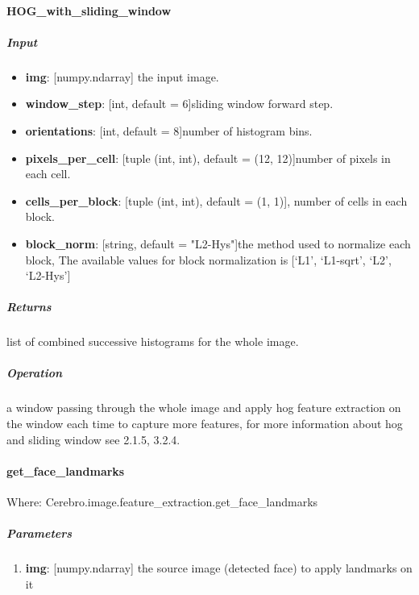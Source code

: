 \paragraph{HOG\_with\_sliding\_window}
\subparagraph{Input}
\begin{changemargin}{0.5cm}{0cm}
\begin{itemize}
\item  \textbf{img}: [numpy.ndarray] the input image.
\item  \textbf{window\_step}: [int, default = 6]sliding window forward step.
\item  \textbf{orientations}: [int, default = 8]number of histogram bins.
\item \textbf{pixels\_per\_cell}: [tuple (int, int), default = (12, 12)]number of pixels in each cell.
\item  \textbf{cells\_per\_block}: [tuple (int, int), default = (1, 1)], number of cells in each block.
\item  \textbf{block\_norm}: [string, default = "L2-Hys"]the method used to normalize each block, The available values for block normalization is [‘L1’, ‘L1-sqrt’, ‘L2’, ‘L2-Hys’]
\end{itemize}
\end{changemargin}

\subparagraph{Returns}
\begin{changemargin}{0.5cm}{0cm}
list of combined successive histograms for the whole image.
\end{changemargin}

\subparagraph{Operation} 
\begin{changemargin}{0.5cm}{0cm}
a window passing through the whole image and apply hog feature extraction on the window each time to capture more features, for more information about hog and sliding window see 2.1.5, 3.2.4.
\end{changemargin}

\paragraph{get\_face\_landmarks}
Where: Cerebro.image.feature\_extraction.get\_face\_landmarks
\subparagraph{Parameters}
\begin{changemargin}{0.5cm}{0cm}
	\begin{enumerate} 
		\item \textbf{img}: [numpy.ndarray] the source image (detected face) to apply landmarks on it
	\end{enumerate}
\end{changemargin}

